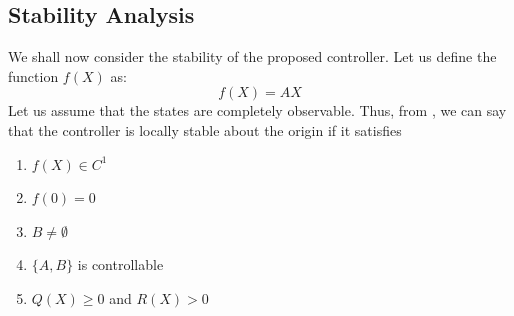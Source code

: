 \documentclass[conf]{new-aiaa}
\begin{document}
\subsection{Stability Analysis}
We shall now consider the stability of the proposed controller. Let us define the function $f(X)$ as:
\begin{equation}
f(X)=AX
\end{equation}
Let us assume that the states are completely observable. Thus, from \cite{cimensdrestability}, we can say that the controller is locally stable about the origin if it satisfies
\begin{enumerate}
\item $f(X) \in C^{1}$
\item $f(0) = 0$
\item $B \neq \emptyset$
\item $\{A,B\}$ is controllable
\item $Q(X) \geq 0$ and $R(X) > 0$ 
\end{enumerate}
\end{document}
